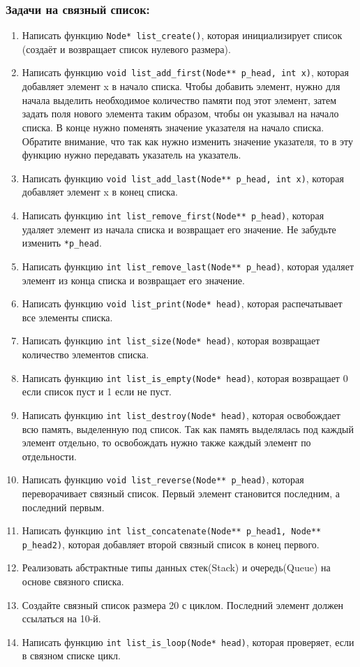 \documentclass{article}
\begin{document}
\subsubsection*{Задачи на связный список:}
\begin{enumerate}
\item Написать функцию \texttt{Node* list\_create()}, которая инициализирует список (создаёт и возвращает список нулевого размера). 
\item Написать функцию \texttt{void list\_add\_first(Node** p\_head, int x)}, которая добавляет элемент x в начало списка. Чтобы добавить элемент, нужно для начала выделить необходимое количество памяти под этот элемент, затем задать поля нового элемента таким образом, чтобы он указывал на начало списка. В конце нужно поменять значение указателя на начало списка. Обратите внимание, что так как нужно изменить значение указателя, то в эту функцию нужно передавать указатель на указатель.
\item Написать функцию \texttt{void list\_add\_last(Node** p\_head, int x)}, которая добавляет элемент x в конец списка. 
\item Написать функцию \texttt{int list\_remove\_first(Node** p\_head)}, которая удаляет элемент из начала списка и возвращает его значение. Не забудьте изменить \texttt{*p\_head}.
\item Написать функцию \texttt{int list\_remove\_last(Node** p\_head)}, которая удаляет элемент из конца списка и возвращает его значение. 
\item Написать функцию \texttt{void list\_print(Node* head)}, которая распечатывает все элементы списка.
\item Написать функцию \texttt{int list\_size(Node* head)}, которая возвращает количество элементов списка.
\item Написать функцию \texttt{int list\_is\_empty(Node* head)}, которая возвращает 0 если список пуст и 1 если не пуст.
\item Написать функцию \texttt{int list\_destroy(Node* head)}, которая освобождает всю память, выделенную под список. Так как память выделялась под каждый элемент отдельно, то освобождать нужно также каждый элемент по отдельности.

\item Написать функцию \texttt{void list\_reverse(Node** p\_head)}, которая переворачивает связный список. Первый элемент становится последним, а последний первым. 

\item Написать функцию \texttt{int list\_concatenate(Node** p\_head1, Node** p\_head2)}, которая добавляет второй связный список в конец первого.

\item Реализовать абстрактные типы данных стек(Stack) и очередь(Queue) на основе связного списка. 

\item Создайте связный список размера 20 с циклом. Последний элемент должен ссылаться на 10-й.

\item Написать функцию \texttt{int list\_is\_loop(Node* head)}, которая проверяет, если в связном списке цикл.
\end{enumerate}
\end{document}
